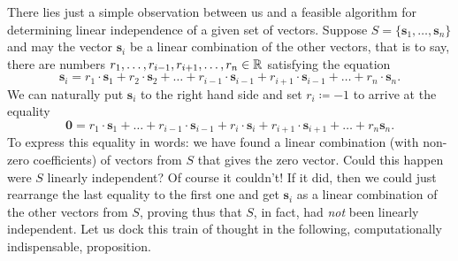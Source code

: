 There lies just a simple observation between us and a feasible algorithm for
determining linear independence of a given set of vectors. Suppose $S =
\{\mathbf{s}_1,\ldots,\mathbf{s}_n\}$ and may the vector $\mathbf{s}_i$ be a
linear combination of the other vectors, that is to say, there are numbers
$r_1,\ldots,r_{i-1},r_{i+1},\ldots,r_n \in \mathbb{R}$ satisfying the equation
\[
 \mathbf{s}_i = r_1 \cdot \mathbf{s}_1 + r_2 \cdot \mathbf{s}_2 + \ldots +
 r_{i-1} \cdot \mathbf{s}_{i-1} + r_{i+1} \cdot \mathbf{s}_{i-1} + \ldots + r_n
 \cdot \mathbf{s}_n.
\]
We can naturally put $\mathbf{s}_i$ to the right hand side and set $r_i
\coloneqq -1$ to arrive at the equality
\[
 \mathbf{0} = r_1 \cdot \mathbf{s}_1 + \ldots + r_{i-1} \cdot \mathbf{s}_{i-1} +
 r_i \cdot \mathbf{s}_i + r_{i+1} \cdot \mathbf{s}_{i+1} + \ldots + r_n
 \mathbf{s}_n.
\]
To express this equality in words: we have found a linear combination (with
non-zero coefficients) of vectors from $S$ that gives the zero vector. Could
this happen were $S$ linearly independent? Of course it couldn't! If it did,
then we could just rearrange the last equality to the first one and get
$\mathbf{s}_i$ as a linear combination of the other vectors from $S$, proving
thus that $S$, in fact, had \emph{not} been linearly independent. Let us dock
this train of thought in the following, computationally indispensable,
proposition.

